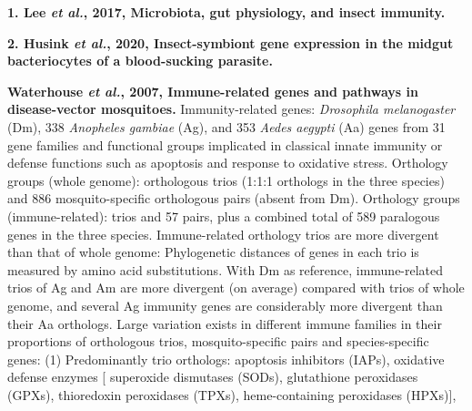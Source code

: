 \documentclass[11pt]{article}
\title{}
\author{}
\date{}
\begin{document}
\begin{sloppypar}
  \maketitle

  \linenumbers
\textbf{1. Lee \textit{et al.}, 2017, Microbiota, gut physiology, and insect immunity.}
\par
\textbf{2. Husink \textit{et al.}, 2020, Insect-symbiont gene expression in the midgut bacteriocytes of a blood-sucking parasite.}

\par

\textbf{Waterhouse \textit{et al.}, 2007, Immune-related genes and pathways in disease-vector mosquitoes.} \newline
Immunity-related genes: \textit{Drosophila melanogaster} (Dm), 338 \textit{Anopheles gambiae} (Ag), and 353 \textit{Aedes aegypti} (Aa) genes from 31 gene families and functional groups implicated in classical innate immunity or defense functions such as apoptosis and response to oxidative stress. \newline
Orthology groups (whole genome):  orthologous trios (1:1:1 orthologs in the three species) and 886 mosquito-specific orthologous pairs (absent from Dm). \newline
Orthology groups (immune-related): trios and 57 pairs, plus a combined total of 589 paralogous genes in the three species. \newline
Immune-related orthology trios are more divergent than that of whole genome: \newline
Phylogenetic distances of genes in each trio is measured by amino acid substitutions. 
With Dm as reference, immune-related trios of Ag and Am are more divergent (on average) compared with trios of whole genome, and several Ag immunity genes are considerably more divergent than their Aa orthologs.\newline
Large variation exists in different immune families in their proportions of orthologous trios,
mosquito-specific pairs and species-specific genes: \newline
(1) Predominantly trio orthologs: 
apoptosis inhibitors (IAPs), 
oxidative defense enzymes [
    superoxide dismutases (SODs), 
    glutathione peroxidases (GPXs), 
    thioredoxin peroxidases (TPXs), 
    heme-containing peroxidases (HPXs)],

\end{sloppypar}
\end{document}
